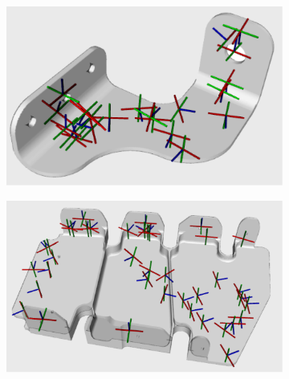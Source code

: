 \begin{figure}[h!]
{\begin{tcolorbox}
\begin{subfigure}[c]{.23\textwidth}
          \caption{}
          \label{fig:cover_plate_candidates}
      \end{subfigure}
      \hfill
      \begin{subfigure}[c]{.23\textwidth}
          \centering
          \includegraphics[trim={0cm 0cm 0cm 0cm},clip,width=1\linewidth,angle=0]{Cap5/Figuras/candidates_plot/double_side_bracket_candidates.pdf}
          \caption{}
          \label{fig:double_side_bracket_candidates}
      \end{subfigure}
      \hfill
      \begin{subfigure}[c]{.23\textwidth}
         \centering
         \includegraphics[trim={0cm 0cm 0cm 0cm},clip,width=1\linewidth,angle=0]{Cap5/Figuras/candidates_plot/multi_side_bracket_candidates.pdf}
         \caption{}
         \label{fig:multi_side_bracket_candidates}
      \end{subfigure}
      \hfill
      \begin{subfigure}[c]{.23\textwidth}

\end{subfigure}
\end{tcolorbox}}
\end{figure}
